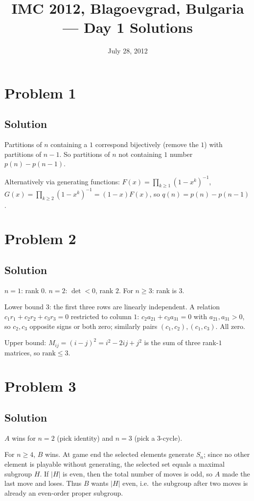 \documentclass{article}
\title{IMC 2012, Blagoevgrad, Bulgaria --- Day 1 Solutions}
\date{July 28, 2012}
\begin{document}
\maketitle

\section*{Problem 1}
\subsection*{Solution}
Partitions of $n$ containing a $1$ correspond bijectively (remove the $1$) with partitions of $n-1$. So partitions of $n$ not containing $1$ number $p(n) - p(n-1)$.

Alternatively via generating functions: $F(x) = \prod_{k \ge 1}(1-x^k)^{-1}$, $G(x) = \prod_{k \ge 2}(1-x^k)^{-1} = (1-x) F(x)$, so $q(n) = p(n) - p(n-1)$.

\section*{Problem 2}
\subsection*{Solution}
$n = 1$: rank $0$. $n = 2$: $\det < 0$, rank $2$. For $n \ge 3$: rank is $3$.

Lower bound $3$: the first three rows are linearly independent. A relation $c_1 r_1 + c_2 r_2 + c_3 r_3 = 0$ restricted to column $1$: $c_2 a_{21} + c_3 a_{31} = 0$ with $a_{21}, a_{31} > 0$, so $c_2, c_3$ opposite signs or both zero; similarly pairs $(c_1, c_2), (c_1, c_3)$. All zero.

Upper bound: $M_{ij} = (i-j)^2 = i^2 - 2ij + j^2$ is the sum of three rank-$1$ matrices, so $\mathrm{rank} \le 3$.

\section*{Problem 3}
\subsection*{Solution}
$A$ wins for $n = 2$ (pick identity) and $n = 3$ (pick a 3-cycle).

For $n \ge 4$, $B$ wins. At game end the selected elements generate $S_n$; since no other element is playable without generating, the selected set equals a maximal subgroup $H$. If $|H|$ is even, then the total number of moves is odd, so $A$ made the last move and loses. Thus $B$ wants $|H|$ even, i.e.\ the subgroup after two moves is already an even-order proper subgroup.
\end{document}
